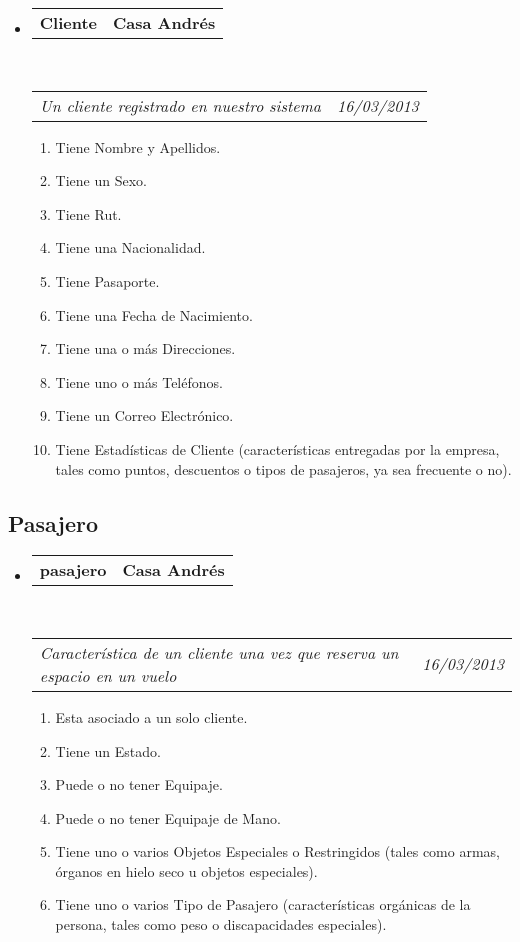 \documentclass[10pt,letterpaper]{article}
\makeatletter
\newcommand{\headerrow}[2]
{\begin{tabular*}{\linewidth}{l@{\extracolsep{\fill}}r}
	#1 &
	#2 \\
\end{tabular*}}
\makeatother
\begin{document}
\begin{itemize}
	\parskip=0.1em

	\item
	\headerrow
		{\textbf{Cliente}}
		{\textbf{Casa Andrés}}
	\\
	\headerrow
		{\emph{Un cliente registrado en nuestro sistema}}
		{\emph{16/03/2013}}
	\begin{enumerate}
		\item Tiene Nombre y Apellidos.
		\item Tiene un Sexo.		
		\item Tiene Rut.
		\item Tiene una Nacionalidad.
		\item Tiene Pasaporte.
		\item Tiene una Fecha de Nacimiento.
		\item Tiene una o más Direcciones.
		\item Tiene uno o más Teléfonos.
		\item Tiene un Correo Electrónico.
		\item Tiene Estadísticas de Cliente (características entregadas por la empresa, tales como puntos, descuentos o tipos de pasajeros, ya sea frecuente o no).
	\end{enumerate}

\end{itemize}

\subsection*{Pasajero}

\begin{itemize}
	\parskip=0.1em

	\item
	\headerrow
		{\textbf{pasajero}}
		{\textbf{Casa Andrés}}
	\\
	\headerrow
		{\emph{Característica de un cliente una vez que reserva un espacio en un vuelo}}
		{\emph{16/03/2013}}
	\begin{enumerate}
		\item Esta asociado a un solo cliente.
		\item Tiene un Estado.
		\item Puede o no tener Equipaje.
		\item Puede o no tener Equipaje de Mano.
		\item Tiene uno o varios Objetos Especiales o Restringidos (tales como armas, órganos en hielo seco u objetos especiales).
		\item Tiene uno o varios Tipo de Pasajero (características orgánicas de la persona, tales como peso o discapacidades especiales).
		
	\end{enumerate}

\end{itemize}
\end{document}
